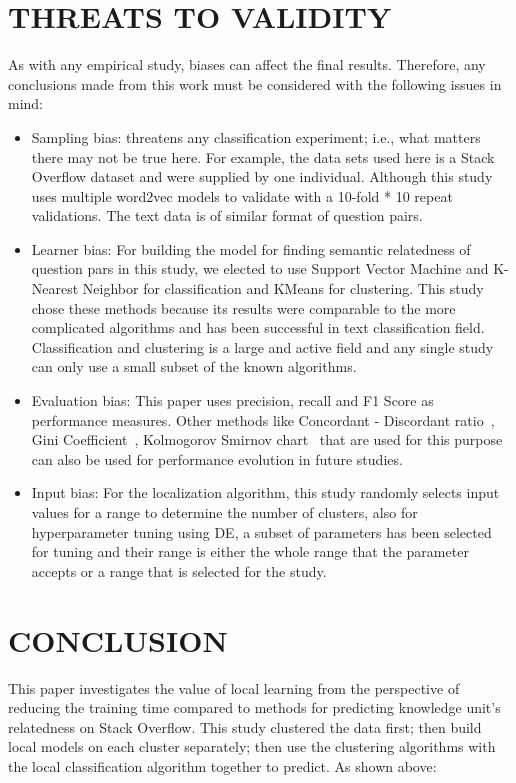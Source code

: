 \documentclass[sigconf]{acmart}
\newcommand{\bi}{\begin{itemize}[leftmargin=0.4cm]}
\newcommand{\ei}{\end{itemize}}
\theoremstyle{break}
\begin{document}
    
\section{THREATS TO VALIDITY}
\label{sect:THREATS TO VALIDITY}
    As with any empirical study, biases can affect the final results. Therefore, any conclusions made from this work must be considered with the following issues in mind:
    \bi
        \item Sampling bias: threatens any classification experiment; i.e., what matters there may not be true here. For example, the data sets used here is a Stack Overflow dataset and were supplied by one individual. Although this study uses multiple word2vec models to validate with a 10-fold * 10 repeat validations. The text data is of similar format of question pairs.
        
        \item Learner bias: For building the model for finding semantic relatedness of question pars in this study, we elected to use Support Vector Machine and K-Nearest Neighbor for classification and KMeans for clustering. This study chose these methods because its results were comparable to the more complicated algorithms and has been successful in text classification field. Classification and clustering is a large and active field and any single study can only use a small subset of the known algorithms. 
        
        \item Evaluation bias: This paper uses precision, recall and F1 Score as performance measures. Other methods like Concordant - Discordant ratio~\cite{goodman1972measures}, Gini Coefficient~\cite{neslin2006defection}, Kolmogorov Smirnov chart~\cite{guo2011case} that are used for this purpose can also be used for performance evolution in future studies.

        \item Input bias: For the localization algorithm, this study randomly selects input values for a range to determine the number of clusters, also for hyperparameter tuning using DE, a subset of parameters has been selected for tuning and their range is either the whole range that the parameter accepts or a range that is selected for the study.
    \ei    


\section{CONCLUSION}
\label{sect:CONCLUSION}
   This paper investigates the value of local learning from the perspective of  reducing the   training time compared to 
    methods for  predicting knowledge unit's relatedness on Stack Overflow. This study   clustered the data first;  then build local models on each cluster separately; then use the clustering algorithms with the local classification algorithm together to predict. As shown above:
    
\end{document}
